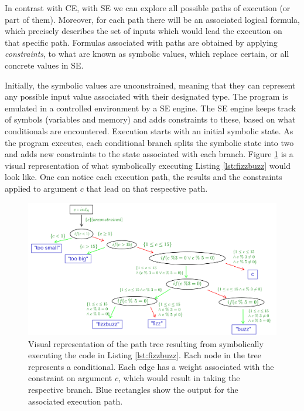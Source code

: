 In contrast with \gls{CE}, with \gls{SE} we can explore all possible paths of execution (or part of them). Moreover, for each path there will be an associated logical formula, which precisely describes the set of inputs which would lead the execution on that specific path. Formulas associated with paths are obtained by applying \emph{constraints}, to what are known as symbolic values, which replace certain, or all concrete values in \gls{SE}.

Initially, the symbolic values are unconstrained, meaning that they can represent any possible input value associated with their designated type. The program is emulated in a controlled environment by a \gls{SE} engine. The \gls{SE} engine keeps track of symbols (variables and memory) and adds constraints to these, based on what conditionals are encountered. Execution starts with an initial symbolic state. As the program executes, each conditional branch splits the symbolic state into two and adds new constraints to the state associated with each branch. Figure \ref{fig:se} is a visual representation of what symbolically executing Listing \ref{lst:fizzbuzz} would look like. One can notice each execution path, the results and the constraints applied to argument $c$ that lead on that respective path.

\begin{figure}[ht]
    \centering
    \includegraphics[width=\textwidth]{./images/SE}
    \caption{Visual representation of the path tree resulting from symbolically executing the code in Listing \ref{lst:fizzbuzz}. Each node in the tree represents a conditional. Each edge has a weight associated with the constraint on argument $c$, which would result in taking the respective branch. Blue rectangles show the output for the associated execution path.}
    \label{fig:se}
\end{figure}

